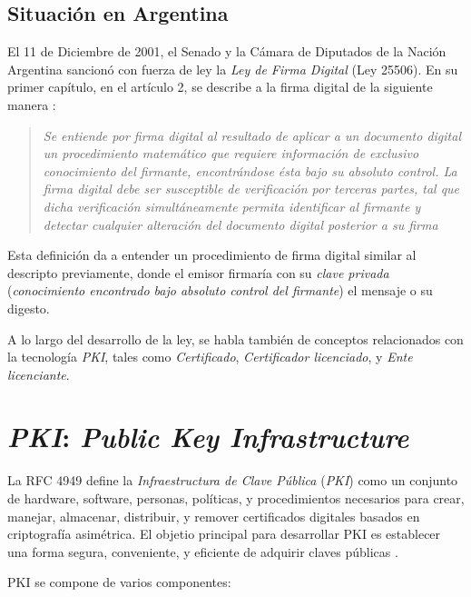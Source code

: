 \subsection{Situación en Argentina}

El 11 de Diciembre de 2001, el Senado y la Cámara de Diputados de la Nación Argentina sancionó con fuerza de ley la \emph{Ley de Firma Digital} (Ley 25506). En su primer capítulo, en el artículo 2, se describe a la firma digital de la siguiente manera \autocite{LeyFirmaDigitalCapUno}:

\begin{quote}\itshape
Se entiende por firma digital al resultado de aplicar a un documento digital un procedimiento matemático que requiere información de exclusivo conocimiento del firmante, encontrándose ésta bajo su absoluto control. La firma digital debe ser susceptible de verificación por terceras partes, tal que dicha verificación simultáneamente permita identificar al firmante y detectar cualquier alteración del documento digital posterior a su firma
\end{quote}

Esta definición da a entender un procedimiento de firma digital similar al descripto previamente, donde el emisor firmaría con su \emph{clave privada} (\emph{conocimiento encontrado bajo absoluto control del firmante}) el mensaje o su digesto.

A lo largo del desarrollo de la ley, se habla también de conceptos relacionados con la tecnología \emph{PKI}, tales como \emph{Certificado}, \emph{Certificador licenciado}, y \emph{Ente licenciante}.    


\section{\emph{PKI}: \emph{Public Key Infrastructure}}
La RFC 4949 define la \emph{Infraestructura de Clave Pública} (\emph{PKI}) como un conjunto de hardware, software, personas, políticas, y procedimientos necesarios para crear, manejar, almacenar, distribuir, y remover certificados digitales basados en criptografía asimétrica. El objetio principal para desarrollar PKI es establecer una forma segura, conveniente, y eficiente de adquirir claves públicas \autocite{StallingsPKI}.

PKI se compone de varios componentes:

